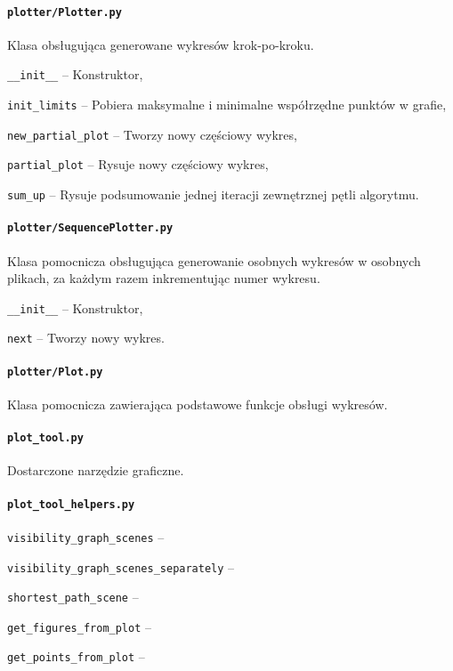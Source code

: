 \documentclass[12pt]{article}
\let\tempone\itemize
\let\temptwo\enditemize
\renewenvironment{itemize}{\tempone\setlength{\itemsep}{0cm}}{\temptwo}
\begin{document}
		\paragraph{\lstinline|plotter/Plotter.py|}
			Klasa obsługująca generowane wykresów krok-po-kroku.
			\begin{itemize}
				\item \lstinline|__init__| -- Konstruktor,
				\item \lstinline|init_limits| -- Pobiera maksymalne i minimalne współrzędne punktów w grafie,
				\item \lstinline|new_partial_plot| -- Tworzy nowy częściowy wykres,
				\item \lstinline|partial_plot| -- Rysuje nowy częściowy wykres,
				\item \lstinline|sum_up| -- Rysuje podsumowanie jednej iteracji zewnętrznej pętli algorytmu.
			\end{itemize}
			
		\paragraph{\lstinline|plotter/SequencePlotter.py|}
			Klasa pomocnicza obsługująca generowanie osobnych wykresów w osobnych plikach, za każdym razem inkrementując numer wykresu.
			\begin{itemize}
				\item \lstinline|__init__| -- Konstruktor,
				\item \lstinline|next| -- Tworzy nowy wykres.
			\end{itemize}

		\paragraph{\lstinline|plotter/Plot.py|}
			Klasa pomocnicza zawierająca podstawowe funkcje obsługi wykresów.

		\paragraph{\lstinline|plot_tool.py|}
			Dostarczone narzędzie graficzne.
			
		\paragraph{\lstinline|plot_tool_helpers.py|}
			\begin{itemize}
				\item \lstinline|visibility_graph_scenes| -- 
				\item \lstinline|visibility_graph_scenes_separately| -- 
				\item \lstinline|shortest_path_scene| -- 
				\item \lstinline|get_figures_from_plot| -- 
				\item \lstinline|get_points_from_plot| -- 
			\end{itemize}
			
\end{document}

